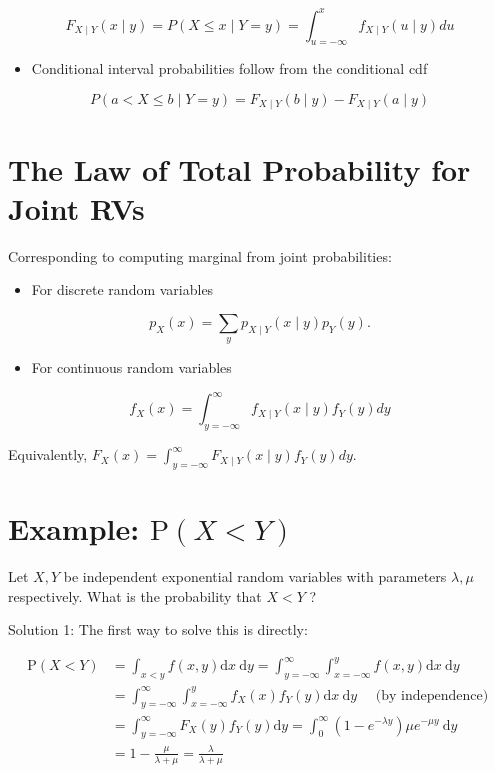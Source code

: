 \documentclass[10pt]{article}
\begin{document}
$$
F_{X \mid Y}(x \mid y)=P(X \leq x \mid Y=y)=\int_{u=-\infty}^{x} f_{X \mid Y}(u \mid y) d u
$$

\begin{itemize}
  \item Conditional interval probabilities follow from the conditional cdf
\end{itemize}

$$
P(a<X \leq b \mid Y=y)=F_{X \mid Y}(b \mid y)-F_{X \mid Y}(a \mid y)
$$

\section*{The Law of Total Probability for Joint RVs}
Corresponding to computing marginal from joint probabilities:

\begin{itemize}
  \item For discrete random variables
\end{itemize}

$$
p_{X}(x)=\sum_{y} p_{X \mid Y}(x \mid y) p_{Y}(y) .
$$

\begin{itemize}
  \item For continuous random variables
\end{itemize}

$$
f_{X}(x)=\int_{y=-\infty}^{\infty} f_{X \mid Y}(x \mid y) f_{Y}(y) d y
$$

Equivalently, $F_{X}(x)=\int_{y=-\infty}^{\infty} F_{X \mid Y}(x \mid y) f_{Y}(y) d y$.

\section*{Example: $\mathrm{P}(X<Y)$}
Let $X, Y$ be independent exponential random variables with parameters $\lambda, \mu$ respectively. What is the probability that $X<Y$ ?

Solution 1: The first way to solve this is directly:

$$
\begin{aligned}
\mathrm{P}(X<Y) & =\int_{x<y} f(x, y) \mathrm{d} x \mathrm{~d} y=\int_{y=-\infty}^{\infty} \int_{x=-\infty}^{y} f(x, y) \mathrm{d} x \mathrm{~d} y \\
& =\int_{y=-\infty}^{\infty} \int_{x=-\infty}^{y} f_{X}(x) f_{Y}(y) \mathrm{d} x \mathrm{~d} y \quad \text { (by independence) } \\
& =\int_{y=-\infty}^{\infty} F_{X}(y) f_{Y}(y) \mathrm{d} y=\int_{0}^{\infty}\left(1-e^{-\lambda y}\right) \mu e^{-\mu y} \mathrm{~d} y \\
& =1-\frac{\mu}{\lambda+\mu}=\frac{\lambda}{\lambda+\mu}
\end{aligned}
$$
\end{document}
